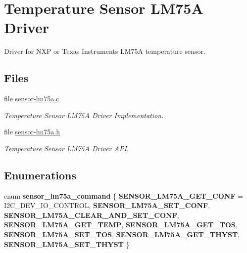 \hypertarget{group__I2CSensorLM75A}{}\section{Temperature Sensor L\+M75A Driver}
\label{group__I2CSensorLM75A}


Driver for N\+XP or Texas Instruments L\+M75A temperature sensor.  


\subsection*{Files}
\begin{DoxyCompactItemize}
\item 
file \mbox{\hyperlink{sensor-lm75a_8c}{sensor-\/lm75a.\+c}}
\begin{DoxyCompactList}\small\item\em Temperature Sensor L\+M75A Driver Implementation. \end{DoxyCompactList}\item 
file \mbox{\hyperlink{sensor-lm75a_8h}{sensor-\/lm75a.\+h}}
\begin{DoxyCompactList}\small\item\em Temperature Sensor L\+M75A Driver A\+PI. \end{DoxyCompactList}\end{DoxyCompactItemize}
\subsection*{Enumerations}
\begin{DoxyCompactItemize}
\item 
\mbox{\label{group__I2CSensorLM75A_ga34fad634a819614142c409f118d0335c}} 
enum {\bfseries sensor\+\_\+lm75a\+\_\+command} \{ \newline
{\bfseries S\+E\+N\+S\+O\+R\+\_\+\+L\+M75\+A\+\_\+\+G\+E\+T\+\_\+\+C\+O\+NF} = I2\+C\+\_\+\+D\+E\+V\+\_\+\+I\+O\+\_\+\+C\+O\+N\+T\+R\+OL, 
{\bfseries S\+E\+N\+S\+O\+R\+\_\+\+L\+M75\+A\+\_\+\+S\+E\+T\+\_\+\+C\+O\+NF}, 
{\bfseries S\+E\+N\+S\+O\+R\+\_\+\+L\+M75\+A\+\_\+\+C\+L\+E\+A\+R\+\_\+\+A\+N\+D\+\_\+\+S\+E\+T\+\_\+\+C\+O\+NF}, 
{\bfseries S\+E\+N\+S\+O\+R\+\_\+\+L\+M75\+A\+\_\+\+G\+E\+T\+\_\+\+T\+E\+MP}, 
\newline
{\bfseries S\+E\+N\+S\+O\+R\+\_\+\+L\+M75\+A\+\_\+\+G\+E\+T\+\_\+\+T\+OS}, 
{\bfseries S\+E\+N\+S\+O\+R\+\_\+\+L\+M75\+A\+\_\+\+S\+E\+T\+\_\+\+T\+OS}, 
{\bfseries S\+E\+N\+S\+O\+R\+\_\+\+L\+M75\+A\+\_\+\+G\+E\+T\+\_\+\+T\+H\+Y\+ST}, 
{\bfseries S\+E\+N\+S\+O\+R\+\_\+\+L\+M75\+A\+\_\+\+S\+E\+T\+\_\+\+T\+H\+Y\+ST}
 \}
\end{DoxyCompactItemize}
